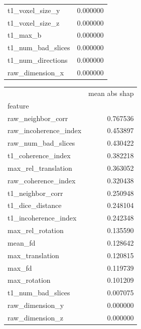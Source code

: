 \documentclass[9pt,lineno]{elife}
\begin{document}
\begin{appendixbox}
\begin{multicols}{2}
\begin{tabular}{lr|}
t1\_voxel\_size\_y       &                  0.000000 \\
t1\_voxel\_size\_z       &                  0.000000 \\
t1\_max\_b              &                  0.000000 \\
t1\_num\_bad\_slices     &                  0.000000 \\
t1\_num\_directions     &                  0.000000 \\
raw\_dimension\_x       &                  0.000000 \\
\bottomrule
\end{tabular}

{\nolinenumbers
\begin{tabular}{|lr}
\toprule
{} &  mean abs shap \\
feature               &                           \\
\midrule
raw\_neighbor\_corr     &                  0.767536 \\
raw\_incoherence\_index &                  0.453897 \\
raw\_num\_bad\_slices    &                  0.430422 \\
t1\_coherence\_index    &                  0.382218 \\
max\_rel\_translation   &                  0.363052 \\
raw\_coherence\_index   &                  0.320438 \\
t1\_neighbor\_corr      &                  0.250948 \\
t1\_dice\_distance      &                  0.248104 \\
t1\_incoherence\_index  &                  0.242348 \\
max\_rel\_rotation      &                  0.135590 \\
mean\_fd               &                  0.128642 \\
max\_translation       &                  0.120815 \\
max\_fd                &                  0.119739 \\
max\_rotation          &                  0.101209 \\
t1\_num\_bad\_slices     &                  0.007075 \\
raw\_dimension\_y       &                  0.000000 \\
raw\_dimension\_z       &                  0.000000 \\

\end{tabular}}
\end{multicols}
\end{appendixbox}
\end{document}
